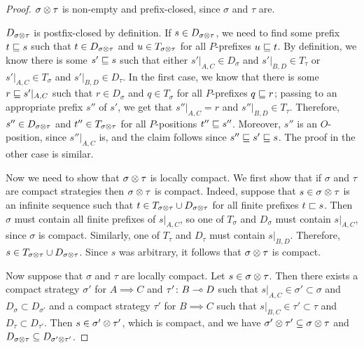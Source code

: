 \documentclass{entcs} \usepackage{prentcsmacro}
\newcommand{\0}{{\mathtt{0}}}
\begin{document}
  \begin{proof}
    $\sigma\otimes\tau$ is non-empty and prefix-closed, since $\sigma$ and $\tau$ are.  
    
    $D_{\sigma\otimes\tau}$ is postfix-closed by definition.  If $s\in D_{\sigma\otimes\tau}$, we need to find some prefix $t\sqsubseteq s$ such that $t\in D_{\sigma\otimes\tau}$ and $u\in T_{\sigma\otimes\tau}$ for all $P$-prefixes $u\sqsubseteq t$.  By definition, we know there is some $s'\sqsubseteq s$ such that either $s'\vert_{A,C}\in D_\sigma$ and $s'\vert_{B,D}\in T_\tau$ or $s'\vert_{A,C}\in T_\sigma$ and $s'\vert_{B,D}\in D_\tau$.  In the first case, we know that there is some $r\sqsubseteq s'\vert_{A,C}$ such that $r\in D_\sigma$ and $q\in T_\sigma$ for all $P$-prefixes $q\sqsubseteq r$; passing to an appropriate prefix $s''$ of $s'$, we get that $s''\vert_{A,C}=r$ and $s''\vert_{B,D}\in T_\tau$.  Therefore, $s''\in D_{\sigma\otimes\tau}$ and $t''\in T_{\sigma\otimes\tau}$ for all $P$-positions $t''\sqsubseteq s''$.  Moreover, $s''$ is an $O$-position, since $s''\vert_{A,C}$ is, and the claim follows since $s''\sqsubseteq s'\sqsubseteq s$.  The proof in the other case is similar.

    Now we need to show that $\sigma\otimes\tau$ is locally compact.  We first show that if $\sigma$ and $\tau$ are compact strategies then $\sigma\otimes\tau$ is compact.  Indeed, suppose that $s\in\sigma\otimes\tau$ is an infinite sequence such that $t\in T_{\sigma\otimes\tau}\cup D_{\sigma\otimes\tau}$ for all finite prefixes $t\sqsubset s$.  Then $\sigma$ must contain all finite prefixes of $s\vert_{A,C}$, so one of $T_\sigma$ and $D_\sigma$ must contain $s\vert_{A,C}$, since $\sigma$ is compact.  Similarly, one of $T_{\tau}$ and $D_\tau$ must contain $s\vert_{B,D}$.  Therefore, $s\in T_{\sigma\otimes\tau}\cup D_{\sigma\otimes\tau}$.  Since $s$ was arbitrary, it follows that $\sigma\otimes\tau$ is compact.  

    Now suppose that $\sigma$ and $\tau$ are locally compact.  Let $s\in\sigma\otimes\tau$.  Then there exists a compact strategy $\sigma'$ for $A\implies C$ and $\tau'\colon B\multimap D$ such that $s\vert_{A,C}\in\sigma'\subset\sigma$ and $D_\sigma\subset D_{\sigma'}$ and a compact strategy $\tau'$ for $B\implies C$ such that $s\vert_{B,C}\in\tau'\subset \tau$ and $D_\tau\subset D_{\tau'}$.  Then $s\in\sigma'\otimes\tau'$, which is compact, and we have $\sigma'\otimes\tau'\subseteq\sigma\otimes\tau$ and $D_{\sigma\otimes\tau}\subseteq D_{\sigma'\otimes\tau'}$.


\end{proof}
\end{document}
